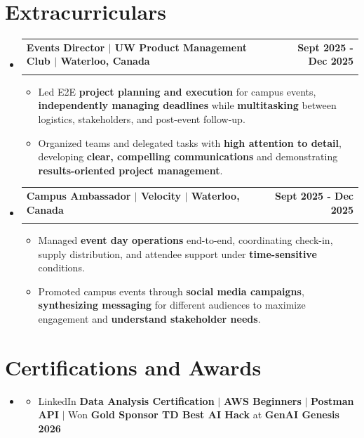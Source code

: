 \documentclass[letterpaper,10pt]{article}
\makeatletter
\newcommand{\resumeItem}[1]{
  \item\small{
    {#1 \vspace{-1pt}}
  }
}
\newcommand{\resumeSubheading}[4]{
  \vspace{-1pt}\item
    \begin{tabular*}{1.0\textwidth}[t]{l@{\extracolsep{\fill}}r}
      \textbf{#1} & \textbf{\small #2} \\
      \textit{\small#3} & \textit{\small #4} \\[-2pt]
    \end{tabular*}\vspace{-7pt}
}
\newcommand{\resumeSubHeadingListStart}{\begin{itemize}[leftmargin=0.0in, label={}]}
\newcommand{\resumeSubHeadingListEnd}{\end{itemize}}
\newcommand{\resumeItemListStart}{\begin{itemize}[leftmargin=0.15in]}
\newcommand{\resumeItemListEnd}{\end{itemize}\vspace{-4pt}}
\makeatother
\begin{document}
\section{Extracurriculars}
  \resumeSubHeadingListStart
    \resumeSubheading
      {Events Director $|$ UW Product Management Club $|$ Waterloo, Canada}{Sept 2025 - Dec 2025}
      {}{}
      \vspace{-13pt}
      \resumeItemListStart
      \vspace{-2pt}
        \resumeItem{Led E2E \textbf{project planning and execution} for campus events, \textbf{independently managing deadlines} while \textbf{multitasking} between logistics, stakeholders, and post-event follow-up.}
        \vspace{-2pt}
        \resumeItem{Organized teams and delegated tasks with \textbf{high attention to detail}, developing \textbf{clear, compelling communications} and demonstrating \textbf{results-oriented project management}.}
      \resumeItemListEnd
      \vspace{-5pt}
    \resumeSubheading
      {Campus Ambassador $|$ Velocity $|$ Waterloo, Canada}{Sept 2025 - Dec 2025}
      {}{}
      \vspace{-13pt}
      \resumeItemListStart
      \vspace{-2pt}
        \resumeItem{Managed \textbf{event day operations} end-to-end, coordinating check-in, supply distribution, and attendee support under \textbf{time-sensitive} conditions.}
        \vspace{-2pt}
        \resumeItem{Promoted campus events through \textbf{social media campaigns}, \textbf{synthesizing messaging} for different audiences to maximize engagement and \textbf{understand stakeholder needs}.}
      \resumeItemListEnd
      \vspace{-2pt}
  \resumeSubHeadingListEnd
\vspace{-13pt}
\section{Certifications and Awards}
    \resumeSubHeadingListStart
      \item[]
          \resumeItemListStart
            \resumeItem{LinkedIn \textbf{Data Analysis Certification} $|$ \textbf{AWS Beginners} $|$ \textbf{Postman API} $|$ Won \textbf{Gold Sponsor TD Best AI Hack} at \textbf{GenAI Genesis 2026}}
          \resumeItemListEnd
          \vspace{-8pt}
        
   \resumeSubHeadingListEnd
\end{document}
